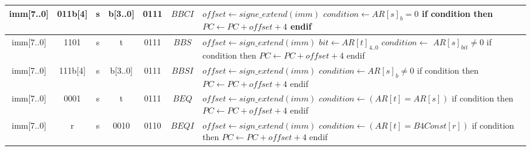 \begin{smalltables}
\begin{longtable}{llllllllllllllllllllllll  p{1cm}  p{7cm} | }
		\multicolumn{8}{|c|}{imm[7..0]} & \multicolumn{4}{c|}{011b[4]} & \multicolumn{4}{c|}{s} & \multicolumn{4}{c|}{b[3..0]} & \multicolumn{4}{c|}{0111} & \multicolumn{1}{c|}{$BBCI$} & $offset \leftarrow signe\_extend(imm)$ \newline $condition \leftarrow AR[s]_{b} = 0$ \newline if condition then \newline $PC \leftarrow PC + offset + 4$ \newline endif\\ \hline
		\multicolumn{8}{|c|}{imm[7..0]} & \multicolumn{4}{c|}{1101} & \multicolumn{4}{c|}{s} & \multicolumn{4}{c|}{t} & \multicolumn{4}{c|}{0111} & \multicolumn{1}{c|}{$BBS$} & $offset \leftarrow sign\_extend(imm)$ \newline $bit \leftarrow AR[t]_{4..0}$ \newline $condition \leftarrow$ $AR[s]_{bit} \neq 0$ \newline if condition then \newline $PC \leftarrow PC + offset + 4$ \newline endif\\ \hline
		\multicolumn{8}{|c|}{imm[7..0]} & \multicolumn{4}{c|}{111b[4]} & \multicolumn{4}{c|}{s} & \multicolumn{4}{c|}{b[3..0]} & \multicolumn{4}{c|}{0111} & \multicolumn{1}{c|}{$BBSI$} & $offset \leftarrow sign\_extend(imm)$ \newline $condition \leftarrow AR[s]_{b} \neq 0$ \newline if condition then \newline $PC \leftarrow PC + offset + 4$ \newline endif\\ \hline
		\multicolumn{8}{|c|}{imm[7..0]} & \multicolumn{4}{c|}{0001} & \multicolumn{4}{c|}{s} & \multicolumn{4}{c|}{t} & \multicolumn{4}{c|}{0111} & \multicolumn{1}{c|}{$BEQ$} & $offset \leftarrow sign\_extend(imm)$ \newline $condition \leftarrow (AR[t]=AR[s])$ \newline if condition then \newline $PC \leftarrow PC + offset + 4$ \newline endif\\ \hline
		\multicolumn{8}{|c|}{imm[7..0]} & \multicolumn{4}{c|}{r} & \multicolumn{4}{c|}{s} & \multicolumn{4}{c|}{0010} & \multicolumn{4}{c|}{0110} & \multicolumn{1}{c|}{$BEQI$} & $offset \leftarrow sign\_extend(imm)$ \newline $condition \leftarrow (AR[t] = B4Const[r])$ \newline if condition then \newline $PC \leftarrow PC + offset + 4$ \newline endif\\ \hline


\end{longtable}
\end{smalltables}
